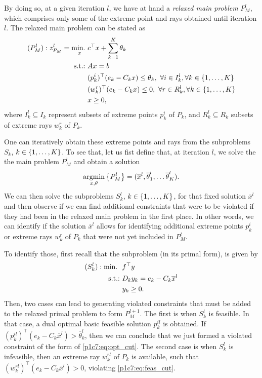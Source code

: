 By doing so, at a given iteration $l$, we have at hand a \emph{relaxed main problem} $P_M^l$, which comprises only some of the extreme point and rays obtained until iteration $l$. The relaxed main problem can be stated as
%
\begin{align*}
	(P^l_M) : z_{P_M}^l = \mathop{\text{min.~}}_x & c^\top x + \sum_{k=1}^K\theta_k \\
	\mathop{\text{s.t.:~}}   & Ax = b \nonumber \\
		  & (p^i_k)^\top (e_k - C_k x) \leq  \theta_k, \ \forall i \in I_k^l, \forall k \in \left\{ 1, \dots, K \right \}  \\
		  & (w^r_k)^\top (e_k - C_k x) \leq 0, \ \forall r \in R_k^l, \forall k \in \left\{ 1, \dots, K \right \}  \\
	      & x \geq 0, 
\end{align*}
%
where $I_k^l \subseteq I_k$ represent subsets of extreme points $p^i_k$ of $P_k$, and $R^l_k \subseteq R_k$ subsets of extreme rays $w^r_k$ of $P_k$.

One can iteratively obtain these extreme points and rays from the subproblems $S_k$, $k \in \left\{ 1, \dots, K \right \}$. To see that, let us fist define that, at iteration $l$, we solve the the main problem $P_M^l$ and obtain a solution
%
\begin{equation*}
	\mathop{\rm argmin}_{x, \theta} \left\{ P_M^l \right \} = (\overline{x}^l, \overline{\theta}^l_1, \dots \overline{\theta}^l_K). 
\end{equation*}
%
We can then solve the subproblems $S_k^l$, $k \in \left\{ 1, \dots, K \right \}$, for that fixed solution $\overline{x}^l$ and then observe if we can find additional constraints that were to be violated if they had been in the relaxed main problem in the first place. In other words, we can identify if the solution $\overline{x}^l$ allows for identifying additional extreme points $p^i_k$ or extreme rays $w^r_k$ of $P_k$ that were not yet included in $P_M^l$.

To identify those, first recall that the subproblem (in its primal form), is given by
%
\begin{align*}
	(S_k^l): \mathop{\text{min.~}} \ & f^\top y \\
	\mathop{\text{s.t.:~}} & D_k y_k = e_k - C_k \overline{x}^l \\
	& y_k \geq 0.
\end{align*}
%
Then, two cases can lead to generating violated constraints that must be added to the relaxed primal problem to form $P_M^{l+1}$. The first is when $S_k^l$ is feasible. In that case, a dual optimal basic feasible solution $p^{il}_{k}$ is obtained. If $(p^{il}_k)^\top(e_k - C_k \overline{x}^l) > \overline{\theta}_k^l$, then we can conclude that we just formed a violated constraint of the form of \eqref{p1c7:eq:opt_cut}. The second case is when $S_k^l$ is infeasible, then an extreme ray $w^{rl}_k$ of $P_k$ is available, such that $(w^{rl}_k)^\top(e_k - C_k \overline{x}^l) > 0$, violating \eqref{p1c7:eq:feas_cut}. 

